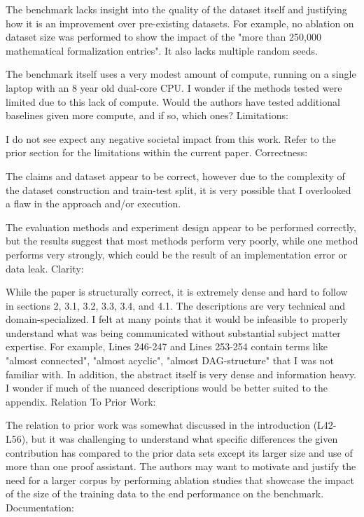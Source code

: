 \documentclass{article}
\begin{document}
The benchmark lacks insight into the quality of the dataset itself and justifying how it is an improvement over pre-existing datasets. For example, no ablation on dataset size was performed to show the impact of the "more than 250,000 mathematical formalization entries". It also lacks multiple random seeds.

The benchmark itself uses a very modest amount of compute, running on a single laptop with an 8 year old dual-core CPU. I wonder if the methods tested were limited due to this lack of compute. Would the authors have tested additional baselines given more compute, and if so, which ones?
Limitations:

I do not see expect any negative societal impact from this work. Refer to the prior section for the limitations within the current paper.
Correctness:

The claims and dataset appear to be correct, however due to the complexity of the dataset construction and train-test split, it is very possible that I overlooked a flaw in the approach and/or execution.

The evaluation methods and experiment design appear to be performed correctly, but the results suggest that most methods perform very poorly, while one method performs very strongly, which could be the result of an implementation error or data leak.
Clarity:

While the paper is structurally correct, it is extremely dense and hard to follow in sections 2, 3.1, 3.2, 3.3, 3.4, and 4.1. The descriptions are very technical and domain-specialized. I felt at many points that it would be infeasible to properly understand what was being communicated without substantial subject matter expertise. For example, Lines 246-247 and Lines 253-254 contain terms like "almost connected", "almost acyclic", "almost DAG-structure" that I was not familiar with. In addition, the abstract itself is very dense and information heavy. I wonder if much of the nuanced descriptions would be better suited to the appendix.
Relation To Prior Work:

The relation to prior work was somewhat discussed in the introduction (L42-L56), but it was challenging to understand what specific differences the given contribution has compared to the prior data sets except its larger size and use of more than one proof assistant. The authors may want to motivate and justify the need for a larger corpus by performing ablation studies that showcase the impact of the size of the training data to the end performance on the benchmark.
Documentation:
\end{document}
